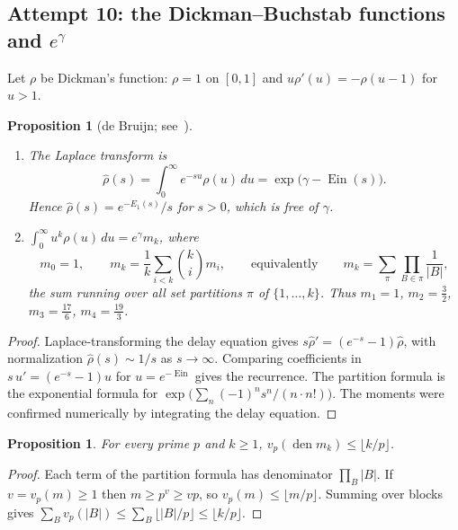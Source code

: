 \documentclass[11pt,a4paper]{article}
\newtheorem{proposition}[theorem]{Proposition}
\theoremstyle{definition}
\theoremstyle{remark}
\DeclareMathOperator{\Ein}{Ein}
\DeclareMathOperator{\den}{den}
\numberwithin{equation}{section}
\begin{document}
\subsection{\texorpdfstring{Attempt 10: the Dickman--Buchstab functions and $e^\gamma$}{Attempt 10: the Dickman-Buchstab functions and exp(gamma)}}

Let $\rho$ be Dickman's function: $\rho=1$ on $[0,1]$ and $u\rho'(u)=-\rho(u-1)$ for $u>1$.

\begin{proposition}[de Bruijn; see~\cite{p4:dB,p4:Ten}]\label{p4:prop:dick}
\begin{enumerate}[label=(\alph*),leftmargin=2em]
\item The Laplace transform is
\[
\hat\rho(s)=\int_0^\infty e^{-su}\rho(u)\,du=\exp\bigl(\gamma-\Ein(s)\bigr).
\]
Hence $\hat\rho(s)=e^{-E_1(s)}/s$ for $s>0$, which is free of $\gamma$.
\item $\int_0^\infty u^k\rho(u)\,du=e^\gamma m_k$, where
\[
m_0=1,\qquad m_k=\frac1k\sum_{i<k}\binom ki m_i,\qquad\text{equivalently}\qquad m_k=\sum_{\pi}\prod_{B\in\pi}\frac1{|B|},
\]
the sum running over all set partitions $\pi$ of $\{1,\dots,k\}$. Thus $m_1=1$, $m_2=\frac32$, $m_3=\frac{17}6$, $m_4=\frac{19}3$.
\end{enumerate}
\end{proposition}

\begin{proof}
Laplace-transforming the delay equation gives $s\hat\rho'=(e^{-s}-1)\hat\rho$, with normalization $\hat\rho(s)\sim1/s$ as $s\to\infty$. Comparing coefficients in $s\,u'=(e^{-s}-1)u$ for $u=e^{-\Ein}$ gives the recurrence. The partition formula is the exponential formula for $\exp\bigl(\sum_n(-1)^ns^n/(n\cdot n!)\bigr)$. The moments were confirmed numerically by integrating the delay equation.
\end{proof}

\begin{proposition}\label{p4:prop:dickden}
For every prime $p$ and $k\ge1$, $v_p(\den m_k)\le\lfloor k/p\rfloor$.
\end{proposition}

\begin{proof}
Each term of the partition formula has denominator $\prod_B|B|$. If $v=v_p(m)\ge1$ then $m\ge p^v\ge vp$, so $v_p(m)\le\lfloor m/p\rfloor$. Summing over blocks gives $\sum_B v_p(|B|)\le\sum_B\lfloor|B|/p\rfloor\le\lfloor k/p\rfloor$.
\end{proof}
\end{document}
